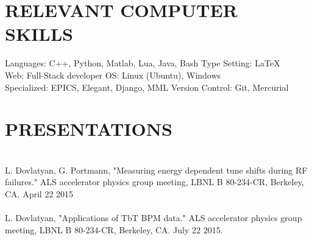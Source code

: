 \documentclass[line,margin]{res}
\begin{document}
\begin{resume}
\section{RELEVANT COMPUTER SKILLS} Languages: C++, Python, Matlab, Lua, Java, Bash \hfill Type Setting: \LaTeX \\
                          Web: Full-Stack developer \hfill OS: Linux (Ubuntu), Windows \\
                          Specialized: EPICS, Elegant, Django, MML \hfill Version Control: Git, Mercurial
\section{PRESENTATIONS} \hfill \\
                L. Dovlatyan, G. Portmann, "Measuring energy dependent tune shifts during RF failures." ALS accelerator physics group meeting, LBNL B 80-234-CR, Berkeley, CA. April 22 2015 \\ \\
                L. Dovlatyan, "Applications of TbT BPM data." ALS accelerator physics group meeting,
LBNL B 80-234-CR, Berkeley, CA. July 22 2015.
 

\end{resume}
\end{document}

